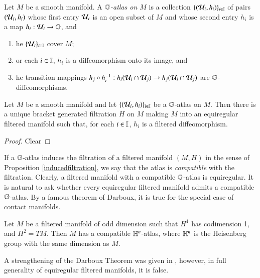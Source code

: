 \documentclass[leqno]{amsart}
\begin{document}
	
	\begin{definition}\label{G-atlas}
		Let $M$ be a smooth manifold. A \textit{$\mathbb{G}$-atlas on $M$} is a collection $\{({\mathcal U}_{i},h_{i})\}_{i\in\mathbb I}$ of pairs $({\mathcal U}_i, h_i)$ whose first entry ${\mathcal U}_i$ is an open subset of $M$ and whose second entry $h_i$ is a map $h_i:{\mathcal U}_i\to\mathbb{G}$, and
		\begin{enumerate}
			\item {}he $\{{\mathcal U}_i\}_{i\in\mathbb I}$ cover $M$;
			\item {}or each $i\in\mathbb I$, $h_i$ is a diffeomorphism onto its image, and
			\item {}he transition mappings $h_j\circ h_i^{-1}:h_i({\mathcal U}_i\cap {\mathcal U}_j)\to h_j({\mathcal U}_i\cap {\mathcal U}_j)$ are $\mathbb{G}$-diffeomorphisms.
		\end{enumerate}
	\end{definition}
	
	\begin{proposition}\label{inducedfiltration}
		Let $M$ be a smooth manifold and let $\{({\mathcal U}_{i},h_{i})\}_{i\in\mathbb I}$ be a $\mathbb{G}$-atlas on $M$. Then there is a unique bracket generated filtration $H$ on $M$ making $M$ into an equiregular filtered manifold such that, for each $i\in\mathbb I$, $h_i$ is a filtered diffeomorphism.
	\end{proposition}
	\begin{proof}
		Clear
	\end{proof}
	
	If a $\mathbb{G}$-atlas induces the filtration of a filtered manifold $(M, H)$ in the sense of Proposition \ref{inducedfiltration}, we say that the atlas is \textit{compatible} with the filtration. Clearly, a filtered manifold with a compatible $\mathbb{G}$-atlas is equiregular. It is natural to ask whether every equiregular filtered manifold admits a compatible $\mathbb{G}$-atlas. By a famous theorem of Darboux, it is true for the special case of contact manifolds.
	
	\begin{theorem}
		Let $M$ be a filtered manifold of odd dimension such that $H^1$ has codimension 1, and $H^2=TM$. Then $M$ has a compatible $\mathbb{H}^n$-atlas, where $\mathbb{H}^n$ is the Heisenberg group with the same dimension as $M$.
	\end{theorem}
	
	A strengthening of the Darboux Theorem was given in \cite[Corollary 3.6.1]{morimoto1993geometric}, however, in full generality of equiregular filtered manifolds, it is false.
	
\end{document}

